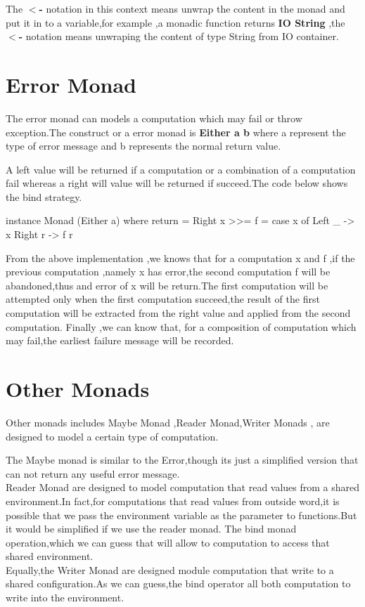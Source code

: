 The \textbf{$<$-} notation in this context means unwrap the content in the monad and put it in to a variable,for example ,a monadic function returns \textbf{IO String} ,the \textbf{$<$-} notation means unwraping the content of type String from IO container.



\section{Error Monad}
The error monad can models a computation which may fail or throw exception.The construct or a error monad is \textbf{Either a b} where a represent the type of error message and b represents the normal return value.

A left value will be returned if a computation or a combination of a computation fail whereas a right will value will be returned if succeed.The code below shows the bind strategy.

\begin{hcode}
instance Monad (Either a) where
    return = Right
    x >>= f = case x of
        Left _ -> x
        Right r -> f r
\end{hcode}

From the above implementation ,we knows that for a computation x and f ,if the previous computation ,namely x has error,the second computation f will be abandoned,thus and error of x will be return.The first computation will be attempted only when the first computation succeed,the result of the first computation will be extracted from the right value and applied from the second computation.
Finally ,we can know that, for a composition of computation which may fail,the earliest failure message will be recorded.


\section{Other Monads}
Other monads includes Maybe Monad ,Reader Monad,Writer Monads , are designed to model a certain type of computation.

The Maybe monad is similar to the Error,though its just a simplified version that can not return any useful error message.\\

Reader Monad are designed to model computation that read values from a shared environment.In fact,for computations that read values from outside word,it is possible that we pass the environment variable as the parameter to functions.But it would be simplified if we use the reader monad.
The bind monad operation,which we can guess that will allow to computation to access that shared environment.\\

Equally,the Writer Monad are designed module computation that write to a shared configuration.As we can guess,the bind operator all both computation to write into the environment.


